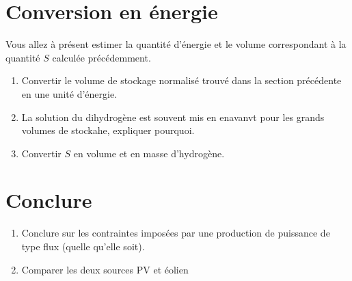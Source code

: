 \documentclass[12pt,a4]{article}
\begin{document}
\section{Conversion en énergie}

Vous allez à présent estimer la quantité d'énergie et le volume correspondant à la quantité $S$ calculée précédemment. 

\begin{enumerate}
	\item Convertir le volume de stockage normalisé trouvé dans la section précédente en une unité d'énergie.
	\item La solution du dihydrogène est souvent mis en enavanvt pour les grands volumes de stockahe, expliquer pourquoi.
	\item Convertir $S$ en volume et en masse d'hydrogène.
\end{enumerate}


\section{Conclure}
\begin{enumerate}
	\item Conclure sur les contraintes imposées par une production de puissance de type flux (quelle qu'elle soit). 
	
	\item Comparer les deux  sources PV et éolien
\end{enumerate}
\end{document}
